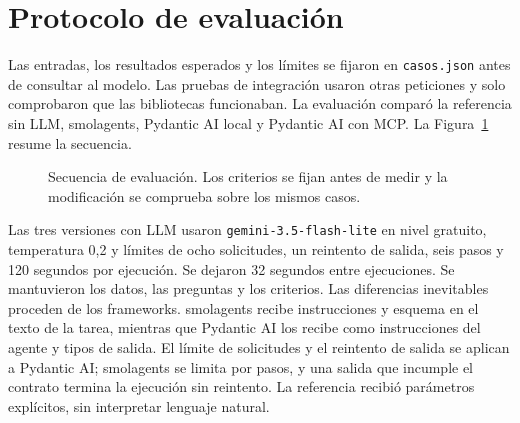 \section{Protocolo de evaluación}

Las entradas, los resultados esperados y los límites se fijaron en \texttt{casos.json} antes de consultar al modelo. Las pruebas de integración usaron otras peticiones y solo comprobaron que las bibliotecas funcionaban. La evaluación comparó la referencia sin LLM, smolagents, Pydantic AI local y Pydantic AI con MCP. La Figura~\ref{fig:evaluacion} resume la secuencia.

\begin{figure}[H]
\centering
{}
\caption{Secuencia de evaluación. Los criterios se fijan antes de medir y la modificación se comprueba sobre los mismos casos.}
\label{fig:evaluacion}
\end{figure}

Las tres versiones con LLM usaron \texttt{gemini-3.5-flash-lite} en nivel gratuito, temperatura 0,2 y límites de ocho solicitudes, un reintento de salida, seis pasos y 120 segundos por ejecución. Se dejaron 32 segundos entre ejecuciones. Se mantuvieron los datos, las preguntas y los criterios. Las diferencias inevitables proceden de los frameworks. smolagents recibe instrucciones y esquema en el texto de la tarea, mientras que Pydantic AI los recibe como instrucciones del agente y tipos de salida. El límite de solicitudes y el reintento de salida se aplican a Pydantic AI; smolagents se limita por pasos, y una salida que incumple el contrato termina la ejecución sin reintento. La referencia recibió parámetros explícitos, sin interpretar lenguaje natural.


